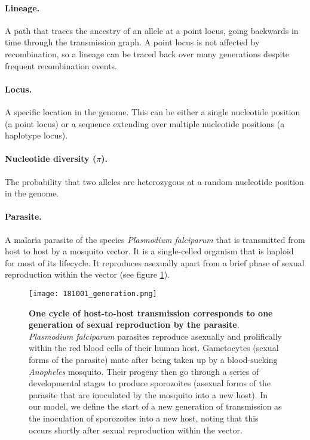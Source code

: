 \documentclass[_main.tex]{subfiles}
\begin{document}
\paragraph{Lineage.} A path that traces the ancestry of an allele at a point locus, going backwards in time through the transmission graph.  A point locus is not affected by recombination, so a lineage can be traced back over many generations despite frequent recombination events.

\paragraph{Locus.}  A specific location in the genome.  This can be either a single nucleotide position (a point locus) or a sequence extending over multiple nucleotide positions (a haplotype locus).

\paragraph{Nucleotide diversity ($\pi$).}  The probability that two alleles are heterozygous at a random nucleotide position in the genome.

\paragraph{Parasite.}  A malaria parasite of the species \textit{Plasmodium falciparum} that is transmitted from host to host by a mosquito vector.  It is a single-celled organism that is haploid for most of its lifecycle.  It reproduces asexually apart from a brief phase of sexual reproduction within the vector (see figure \ref{fig:one_generation}).

\begin{figure}[h!]
\centering
\texttt{[image: 181001\_generation.png]}
\caption{\textbf{One cycle of host-to-host transmission corresponds to one generation of sexual reproduction by the parasite}.  \textit{Plasmodium falciparum} parasites reproduce asexually and prolifically within the red blood cells of their human  host.  Gametocytes (sexual forms of the parasite) mate after being taken up by a blood-sucking \textit{Anopheles} mosquito.  Their progeny then go through a series of developmental stages to produce sporozoites (asexual forms of the parasite that are inoculated by the mosquito into a new host).  In our model, we define the start of a new generation of transmission as the inoculation of sporozoites into a new host, noting that this occurs shortly after sexual reproduction within the vector.
}
\label{fig:one_generation}
\end{figure}
\end{document}
